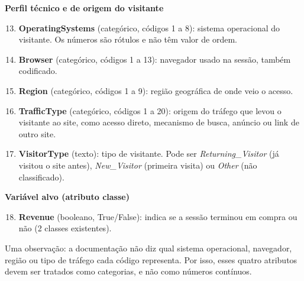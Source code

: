 \documentclass[11pt,a4paper]{article}
\begin{document}
\textbf{Perfil técnico e de origem do visitante}
\begin{enumerate}\setcounter{enumi}{12}
  \item \textbf{OperatingSystems} (categórico, códigos 1 a 8): sistema operacional do visitante. Os números são
        rótulos e não têm valor de ordem.
  \item \textbf{Browser} (categórico, códigos 1 a 13): navegador usado na sessão, também codificado.
  \item \textbf{Region} (categórico, códigos 1 a 9): região geográfica de onde veio o acesso.
  \item \textbf{TrafficType} (categórico, códigos 1 a 20): origem do tráfego que levou o visitante ao site, como
        acesso direto, mecanismo de busca, anúncio ou link de outro site.
  \item \textbf{VisitorType} (texto): tipo de visitante. Pode ser \textit{Returning\_Visitor} (já visitou o site
        antes), \textit{New\_Visitor} (primeira visita) ou \textit{Other} (não classificado).
\end{enumerate}

\textbf{Variável alvo (atributo classe)}
\begin{enumerate}\setcounter{enumi}{17}
  \item \textbf{Revenue} (booleano, True/False): indica se a sessão terminou em compra ou não (2 classes existentes).
\end{enumerate}

Uma observação: a documentação não diz qual sistema operacional, navegador, região ou tipo de tráfego cada código
representa. Por isso, esses quatro atributos devem ser tratados como categorias, e não como números contínuos.
\end{document}
